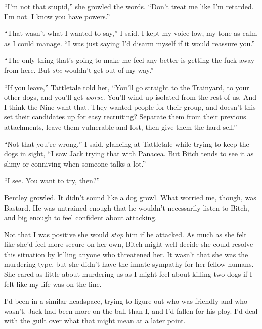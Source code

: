 ``I'm not that stupid,'' she growled the words.  ``Don't treat me like I'm retarded.  I'm not.  I know you have powers.''



``That wasn't what I wanted to say,'' I said.  I kept my voice low, my tone as calm as I could manage.  ``I was just saying I'd disarm myself if it would reassure you.''



``The only thing that's going to make me feel any better is getting the fuck away from here.  But \emph{she} wouldn't get out of my way.''



``If you leave,'' Tattletale told her, ``You'll go straight to the Trainyard, to your other dogs, and you'll get \emph{worse}.  You'll wind up isolated from the rest of us.  And I think the Nine want that.  They wanted people for their group, and doesn't this set their candidates up for easy recruiting?  Separate them from their previous attachments, leave them vulnerable and lost, then give them the hard sell.''



``Not that you're wrong,'' I said, glancing at Tattletale while trying to keep the dogs in sight, ``I saw Jack trying that with Panacea.  But Bitch tends to see it as slimy or conniving when someone talks a lot.''



``I see.  You want to try, then?''



Bentley growled.  It didn't sound like a dog growl.  What worried me, though, was Bastard.  He was untrained enough that he wouldn't necessarily listen to Bitch, and big enough to feel confident about attacking.



Not that I was positive she would \emph{stop} him if he attacked.  As much as she felt like she'd feel more secure on her own, Bitch might well decide she could resolve this situation by killing anyone who threatened her.  It wasn't that she was the murdering type, but she didn't have the innate sympathy for her fellow humans.  She cared as little about murdering us as I might feel about killing two dogs if I felt like my life was on the line.



I'd been in a similar headspace, trying to figure out who was friendly and who wasn't.  Jack had been more on the ball than I, and I'd fallen for his ploy.  I'd deal with the guilt over what that might mean at a later point.



